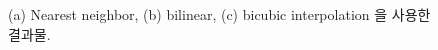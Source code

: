 \documentclass[a4paper, 12p]{paper}
\begin{document}
\begin{figure}[H]
{}
\caption{(a) Nearest neighbor, (b) bilinear, (c) bicubic interpolation 을 사용한 결과물.}
\label{fig:result1}
\end{figure}
\end{document}
